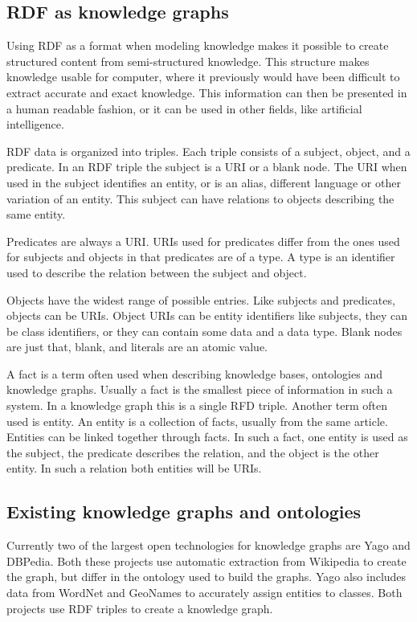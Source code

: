 \subsection{RDF as knowledge graphs}
Using RDF as a format when modeling knowledge makes it possible to create structured content from semi-structured knowledge. This structure makes knowledge usable for computer, where it previously would have been difficult to extract accurate and exact knowledge. This information can then be presented in a human readable fashion, or it can be used in other fields, like artificial intelligence.

RDF data is organized into triples. Each triple consists of a subject, object, and a predicate. In an RDF triple the subject is a URI or a blank node. The URI when used in the subject identifies an entity, or is an alias, different language or other variation of an entity. This subject can have relations to objects describing the same entity.

Predicates are always a URI. URIs used for predicates differ from the ones used for subjects and objects in that predicates are of a type. A type is an identifier used to describe the relation between the subject and object.

Objects have the widest range of possible entries. Like subjects and predicates, objects can be URIs. Object URIs can be entity identifiers like subjects, they can be class identifiers, or they can contain some data and a data type. Blank nodes are just that, blank, and literals are an atomic value. 

A fact is a term often used when describing knowledge bases, ontologies and knowledge graphs. Usually a fact is the smallest piece of information in such a system. In a knowledge graph this is a single RFD triple. Another term often used is entity. An entity is a collection of facts, usually from the same article. Entities can be linked together through facts. In such a fact, one entity is used as the subject, the predicate describes the relation, and the object is the other entity. In such a relation both entities will be URIs.

\subsection{Existing knowledge graphs and ontologies}
Currently two of the largest open technologies for knowledge graphs are Yago and DBPedia. Both these projects use automatic extraction from Wikipedia to create the graph, but differ in the ontology used to build the graphs. Yago also includes data from WordNet and GeoNames to accurately assign entities to classes. Both projects use RDF triples to create a knowledge graph.

